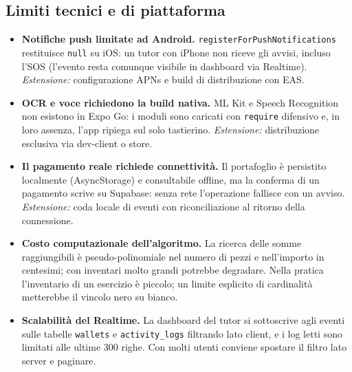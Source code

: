 \documentclass[11pt,a4paper]{article}
\begin{document}
\subsection{Limiti tecnici e di piattaforma}
\begin{itemize}[leftmargin=1.4cm]
  \item \textbf{Notifiche push limitate ad Android.} \texttt{registerForPushNotifications}
  restituisce \texttt{null} su iOS: un tutor con iPhone non riceve gli avvisi, incluso l'SOS
  (l'evento resta comunque visibile in dashboard via Realtime). \emph{Estensione:} configurazione
  APNs e build di distribuzione con EAS.
  \item \textbf{OCR e voce richiedono la build nativa.} ML Kit e Speech Recognition non esistono
  in Expo Go: i moduli sono caricati con \texttt{require} difensivo e, in loro assenza, l'app
  ripiega sul solo tastierino. \emph{Estensione:} distribuzione esclusiva via dev-client o store.
  \item \textbf{Il pagamento reale richiede connettivit\`a.} Il portafoglio \`e persistito
  localmente (AsyncStorage) e consultabile offline, ma la conferma di un pagamento scrive su
  Supabase: senza rete l'operazione fallisce con un avviso. \emph{Estensione:} coda locale di
  eventi con riconciliazione al ritorno della connessione.
  \item \textbf{Costo computazionale dell'algoritmo.} La ricerca delle somme raggiungibili \`e
  pseudo-polinomiale nel numero di pezzi e nell'importo in centesimi; con inventari molto grandi
  potrebbe degradare. Nella pratica l'inventario di un esercizio \`e piccolo; un limite esplicito
  di cardinalit\`a metterebbe il vincolo nero su bianco.
  \item \textbf{Scalabilit\`a del Realtime.} La dashboard del tutor si sottoscrive agli eventi
  sulle tabelle \texttt{wallets} e \texttt{activity\_logs} filtrando lato client, e i log letti
  sono limitati alle ultime 300 righe. Con molti utenti conviene spostare il filtro lato server e
  paginare.
\end{itemize}
\end{document}
